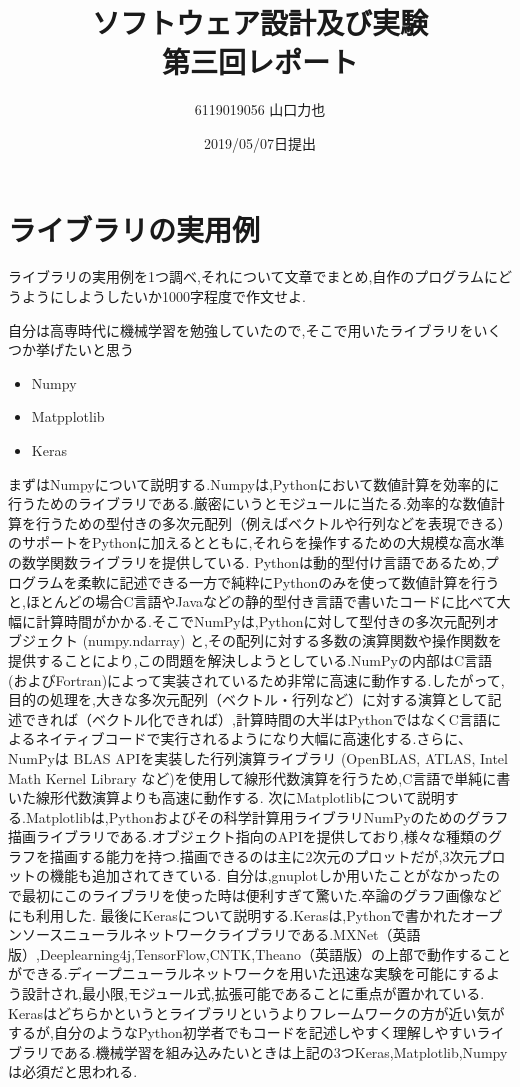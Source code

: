 \documentclass{jarticle}
\title{ソフトウェア設計及び実験\\第三回レポート}
\author{6119019056 山口力也}
\date{2019/05/07日提出}
\begin{document}
\maketitle
\section{ライブラリの実用例}
ライブラリの実用例を1つ調べ,それについて文章でまとめ,自作のプログラムにどうようにしようしたいか1000字程度で作文せよ.

自分は高専時代に機械学習を勉強していたので,そこで用いたライブラリをいくつか挙げたいと思う

\begin{itemize}

\item Numpy
\item Matpplotlib
\item Keras

\end{itemize}

まずはNumpyについて説明する.Numpyは,Pythonにおいて数値計算を効率的に行うためのライブラリである.厳密にいうとモジュールに当たる.効率的な数値計算を行うための型付きの多次元配列（例えばベクトルや行列などを表現できる）のサポートをPythonに加えるとともに,それらを操作するための大規模な高水準の数学関数ライブラリを提供している.
Pythonは動的型付け言語であるため,プログラムを柔軟に記述できる一方で純粋にPythonのみを使って数値計算を行うと,ほとんどの場合C言語やJavaなどの静的型付き言語で書いたコードに比べて大幅に計算時間がかかる.そこでNumPyは,Pythonに対して型付きの多次元配列オブジェクト (numpy.ndarray) と,その配列に対する多数の演算関数や操作関数を提供することにより,この問題を解決しようとしている.NumPyの内部はC言語 (およびFortran)によって実装されているため非常に高速に動作する.したがって,目的の処理を,大きな多次元配列（ベクトル・行列など）に対する演算として記述できれば（ベクトル化できれば）,計算時間の大半はPythonではなくC言語によるネイティブコードで実行されるようになり大幅に高速化する.さらに、NumPyは BLAS APIを実装した行列演算ライブラリ (OpenBLAS, ATLAS, Intel Math Kernel Library など)を使用して線形代数演算を行うため,C言語で単純に書いた線形代数演算よりも高速に動作する.
次にMatplotlibについて説明する.Matplotlibは,Pythonおよびその科学計算用ライブラリNumPyのためのグラフ描画ライブラリである.オブジェクト指向のAPIを提供しており,様々な種類のグラフを描画する能力を持つ.描画できるのは主に2次元のプロットだが,3次元プロットの機能も追加されてきている.
自分は,gnuplotしか用いたことがなかったので最初にこのライブラリを使った時は便利すぎて驚いた.卒論のグラフ画像などにも利用した.
最後にKerasについて説明する.Kerasは,Pythonで書かれたオープンソースニューラルネットワークライブラリである.MXNet（英語版）,Deeplearning4j,TensorFlow,CNTK,Theano（英語版）の上部で動作することができる.ディープニューラルネットワークを用いた迅速な実験を可能にするよう設計され,最小限,モジュール式,拡張可能であることに重点が置かれている.
Kerasはどちらかというとライブラリというよりフレームワークの方が近い気がするが,自分のようなPython初学者でもコードを記述しやすく理解しやすいライブラリである.機械学習を組み込みたいときは上記の3つKeras,Matplotlib,Numpyは必須だと思われる.
\end{document}
